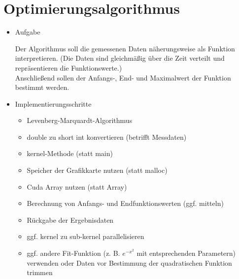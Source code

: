 \section{Optimierungsalgorithmus}
	\begin{itemize}
		\item Aufgabe
		
		Der Algorithmus soll die gemessenen Daten näherungsweise als Funktion interpretieren. (Die Daten sind gleichmäßig über die Zeit verteilt und repräsentieren die Funktionswerte.)\\
		Anschließend sollen der Anfangs-, End- und Maximalwert der Funktion bestimmt werden.\\
		
		\item Implementierungsschritte
		
		\begin{itemize}
			\item Levenberg-Marquardt-Algorithmus
			\item double zu short int konvertieren (betrifft Messdaten)
			\item kernel-Methode (statt main)
			\item Speicher der Grafikkarte nutzen (statt malloc)
			\item Cuda Array nutzen (statt Array)
			\item Berechnung von Anfangs- und Endfunktionswerten (ggf. mitteln)
			\item Rückgabe der Ergebnisdaten
			\item ggf. kernel zu sub-kernel parallelisieren
			\item ggf. andere Fit-Funktion (z. B. $e^{-x^2}$ mit entsprechenden Parametern) verwenden oder Daten vor Bestimmung der quadratischen Funktion trimmen
		\end{itemize}
	\end{itemize}
